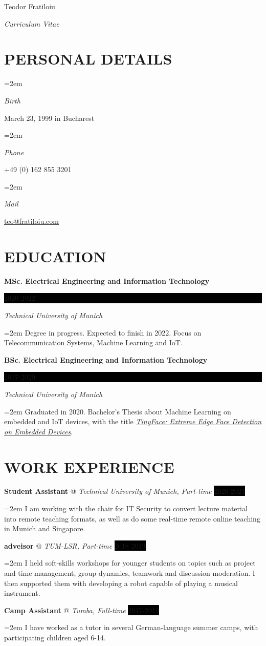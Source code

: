 \documentclass[paper=a4,fontsize=11pt]{scrartcl}
\makeatletter
\newlength{\spacebox}
\newcommand{\sepspace}{\vspace*{1em}}		%
\newcommand{\MyName}[1]{ %
		\Huge \usefont{OT1}{phv}{b}{n} \hfill #1
		\par \normalsize \normalfont}
\newcommand{\MySlogan}[1]{ %
		\large \usefont{OT1}{phv}{m}{n}\hfill \textit{#1}
		\par \normalsize \normalfont}
\newcommand{\NewPart}[1]{\section*{\uppercase{#1}}}
\newcommand{\PersonalEntry}[2]{
		\noindent\hangindent=2em\hangafter=0 %
		\parbox{\spacebox}{        %
		\textit{#1}}		       %
		\hspace{1.5em} #2 \par}    %
\newcommand{\EducationEntry}[4]{
		\noindent \textbf{#1} \hfill      %
		\colorbox{Black}{%
			\parbox{6em}{%
			\hfill\color{White}#2}} \par  %
		\noindent \textit{#3} \par        %
		\noindent\hangindent=2em\hangafter=0 \small #4 %
		\normalsize \par}
\newcommand{\WorkEntry}[4]{				  %
		\noindent \textbf{#1} @ \textit{#3} \hfill      %
		\colorbox{Black}{\color{White}#2} \par  %
		\noindent\hangindent=2em\hangafter=0 \small #4 %
		\normalsize \par}
\makeatother
\begin{document}

\MyName{Teodor Fratiloiu}
\MySlogan{Curriculum Vitae}

\sepspace

\NewPart{Personal details}{}

\PersonalEntry{Birth}{March 23, 1999 in Bucharest}
\PersonalEntry{Phone}{+49 (0) 162 855 3201}
\PersonalEntry{Mail}{\url{teo@fratiloiu.com}}

\NewPart{Education}{}

\EducationEntry{MSc. Electrical Engineering and Information Technology}{2020-2022}{Technical University of Munich}{Degree in progress. Expected to finish in 2022. Focus on Telecommunication Systems, Machine Learning and IoT.}
\sepspace

\EducationEntry{BSc. Electrical Engineering and Information Technology}{2017-2020}{Technical University of Munich}{Graduated in 2020. Bachelor's Thesis about Machine Learning on embedded and IoT devices, with the title \href{https://github.com/munober/thesis/blob/master/digital_edition.pdf}{\textit{TinyFace: Extreme Edge Face Detection on Embedded Devices}}.}

\NewPart{Work experience}{}

\WorkEntry{Student Assistant}{2020-2021}{Technical University of Munich, Part-time}{I am working with the chair for IT Security to convert lecture material into remote teaching formats, as well as do some real-time remote online teaching in Munich and Singapore.}
\sepspace

\WorkEntry{adveisor}{2018-2019}{TUM-LSR, Part-time}{I held soft-skills workshops for younger students on topics such as project and time management, group dynamics, teamwork and discussion moderation. I then supported them with developing a robot capable of playing a musical instrument.}
\sepspace

\WorkEntry{Camp Assistant}{2017-2019}{Tumba, Full-time}{ I have worked as a tutor in several German-language summer camps, with participating children aged 6-14.}
\sepspace
\end{document}
